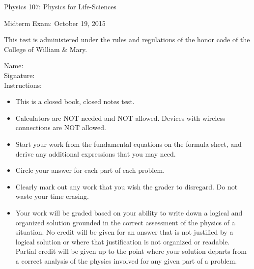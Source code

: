 \documentclass[letterpaper,addpoints,answers]{exam}
\begin{document}
\begin{coverpages}
 \large\bfseries
 
 \noindent 
 Physics 107: Physics for Life-Sciences

 \vspace{2ex}
 \noindent
 Midterm Exam: October 19, 2015

 \vspace{3ex}
 \noindent 
 This test is administered under the rules and regulations of the honor code of the College of William \& Mary.

 \vspace{2ex}
 \noindent 
 Name:\enspace\makebox[2.3in]{\hrulefill} \\

 \noindent 
 Signature:\enspace\makebox[2in]{\hrulefill} \\

 \vspace{5ex}
 \noindent 
 Instructions:
 \begin{itemize}
  \item This is a closed book, closed notes test.
  \item Calculators are NOT needed and NOT allowed. Devices with wireless connections are NOT allowed.
  \item Start your work from the fundamental equations on the formula sheet, and derive any additional expressions that you may need.
  \item Circle your answer for each part of each problem. 
  \item Clearly mark out any work that you wish the grader to disregard.  Do not waste your time erasing.
  \item Your work will be graded based on your ability to write down a logical and organized solution grounded in the correct assessment of the physics of a situation. No credit will be given for an answer that is not justified by a logical solution or where that justification is not organized or readable. Partial credit will be given up to the point where your solution departs from a correct analysis of the physics involved for any given part of a problem.
 \end{itemize}

 \pagebreak

 \begin{center}
  \gradetable[v][questions]
 \end{center}
 
\end{coverpages}
 
\end{document}
